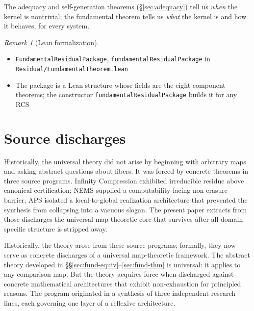 \documentclass[11pt,a4paper]{article}
\theoremstyle{plain}
\theoremstyle{definition}
\theoremstyle{remark}
\newtheorem{remark}[theorem]{Remark}
\begin{document}
The adequacy and self-generation theorems (\S\ref{sec:adequacy}) tell us
\emph{when} the kernel is nontrivial; the fundamental theorem tells us
\emph{what} the kernel is and how it behaves, for every system.

\begin{remark}[Lean formalization]
\leavevmode\par\begin{itemize}[nosep,leftmargin=*,before=\raggedright]
\item \texttt{FundamentalResidualPackage}, \texttt{fundamentalResidualPackage} in \texttt{Residual/FundamentalTheorem.lean}
\item The package is a Lean structure whose fields are the eight component theorems; the constructor \texttt{fundamentalResidualPackage} builds it for any RCS
\end{itemize}
\end{remark}

\section{Source discharges}\label{sec:discharges}

Historically, the universal theory did not arise by beginning with arbitrary
maps and asking abstract questions about fibers. It was forced by concrete
theorems in three source programs. Infinity Compression exhibited irreducible
residue above canonical certification; NEMS supplied a computability-facing
non-erasure barrier; APS isolated a local-to-global realization architecture
that prevented the synthesis from collapsing into a vacuous slogan. The
present paper extracts from those discharges the universal map-theoretic core
that survives after all domain-specific structure is stripped away.

Historically, the theory arose from these source programs; formally, they
now serve as concrete discharges of a universal map-theoretic framework.
The abstract theory developed in \S\S\ref{sec:fund-equiv}--\ref{sec:fund-thm}
is universal: it applies to any comparison map. But the theory acquires force
when discharged against concrete mathematical architectures that exhibit
non-exhaustion for principled reasons. The program originated in a synthesis
of three independent research lines, each governing one layer of a reflexive
architecture.
\end{document}
